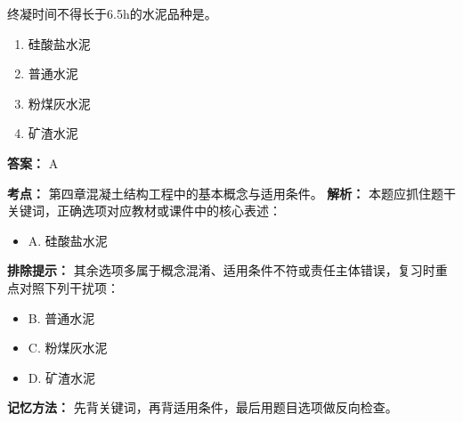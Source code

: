 \documentclass[UTF8,fontset=fandol,11pt]{ctexart}
\begin{document}
\vspace{0.2em}

\begin{quizbox}[title={第 42 题}]
终凝时间不得长于6.5h的水泥品种是。\\
\begin{enumerate}[label=\Alph*.]
\item 硅酸盐水泥
\item 普通水泥
\item 粉煤灰水泥
\item 矿渣水泥
\end{enumerate}
\textbf{答案：} A
\vspace{0.25em}
\begin{answerbox}[title={考点解析}]
\textbf{考点：} 第四章混凝土结构工程中的基本概念与适用条件。
\textbf{解析：} 本题应抓住题干关键词，正确选项对应教材或课件中的核心表述：
\begin{itemize}
\item A. 硅酸盐水泥
\end{itemize}
\textbf{排除提示：} 其余选项多属于概念混淆、适用条件不符或责任主体错误，复习时重点对照下列干扰项：
\begin{itemize}
\item B. 普通水泥
\item C. 粉煤灰水泥
\item D. 矿渣水泥
\end{itemize}
\textbf{记忆方法：} 先背关键词，再背适用条件，最后用题目选项做反向检查。
\end{answerbox}
\end{quizbox}

\vspace{0.2em}
\end{document}
